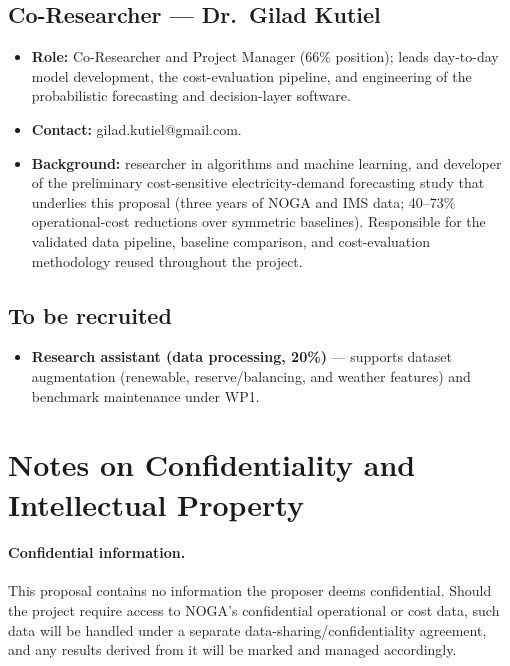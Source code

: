\documentclass[12pt,a4paper]{article}
\begin{document}
\subsection*{Co-Researcher --- Dr.\ Gilad Kutiel}
\begin{itemize}[leftmargin=1.4em]
    \item \textbf{Role:} Co-Researcher and Project Manager (66\% position); leads day-to-day
          model development, the cost-evaluation pipeline, and engineering of the
          probabilistic forecasting and decision-layer software.
    \item \textbf{Contact:} gilad.kutiel@gmail.com.
    \item \textbf{Background:} researcher in algorithms and machine learning, and developer
          of the preliminary cost-sensitive electricity-demand forecasting study that
          underlies this proposal (three years of NOGA and IMS data; 40--73\% operational-cost
          reductions over symmetric baselines). Responsible for the validated data pipeline,
          baseline comparison, and cost-evaluation methodology reused throughout the project.
\end{itemize}

\subsection*{To be recruited}
\begin{itemize}[leftmargin=1.4em]
    \item \textbf{Research assistant (data processing, 20\%)} --- supports dataset
          augmentation (renewable, reserve/balancing, and weather features) and benchmark
          maintenance under WP1.
\end{itemize}

\section*{Notes on Confidentiality and Intellectual Property}

\paragraph{Confidential information.} This proposal contains no information the proposer
deems confidential. Should the project require access to NOGA's confidential operational
or cost data, such data will be handled under a separate data-sharing/confidentiality
agreement, and any results derived from it will be marked and managed accordingly.
\end{document}
